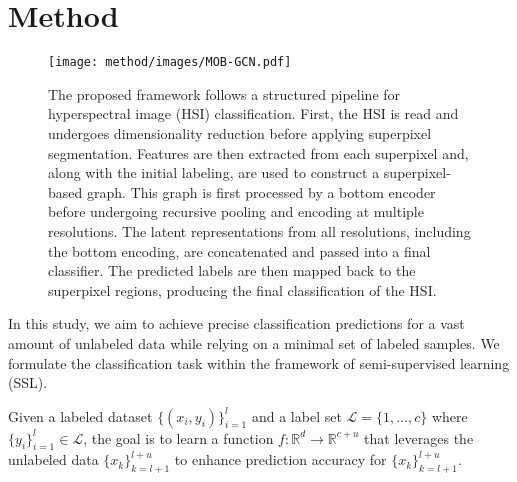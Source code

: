 \section{Method} \label{sec:method}

\begin{figure*}[h!]
    \centering
    \texttt{[image: method/images/MOB-GCN.pdf]}
    \caption{The proposed framework follows a structured pipeline for hyperspectral image (HSI) classification. First, the HSI is read and undergoes dimensionality reduction before applying superpixel segmentation. Features are then extracted from each superpixel and, along with the initial labeling, are used to construct a superpixel-based graph. This graph is first processed by a bottom encoder before undergoing recursive pooling and encoding at multiple resolutions. The latent representations from all resolutions, including the bottom encoding, are concatenated and passed into a final classifier. The predicted labels are then mapped back to the superpixel regions, producing the final classification of the HSI.}
    \label{fig:overall_architecture}
\end{figure*}

In this study, we aim to achieve precise classification predictions for a vast amount of unlabeled data while relying on a minimal set of labeled samples. We formulate the classification task within the framework of semi-supervised learning (SSL).

\begin{definition}  
Given a labeled dataset \(\{(x_i, y_i)\}_{i=1}^l\) and a label set \(\mathcal{L} = \{1, \ldots, c\}\) where \(\{y_i\}_{i=1}^l \in \mathcal{L}\), the goal is to learn a function \(f: \mathbb{R}^d \rightarrow \mathbb{R}^{c+u}\) that leverages the unlabeled data \(\{x_k\}_{k=l+1}^{l+u}\) to enhance prediction accuracy for \(\{x_k\}_{k=l+1}^{l+u}\).  
\end{definition}













